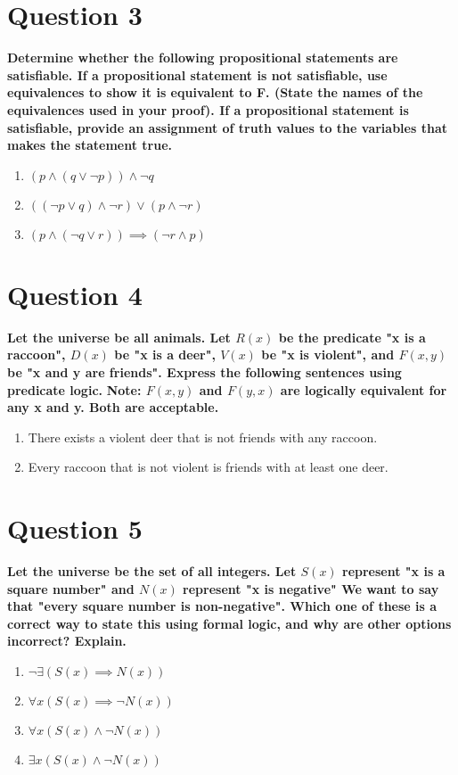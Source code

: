 \documentclass[11pt]{article}
\begin{document}
\clearpage
\section*{Question 3}
    \textbf{ Determine whether the following propositional statements are satisfiable. If a propositional statement is not satisfiable, use equivalences to show it is equivalent to F. (State the names of the equivalences used in your proof). If a propositional statement is satisfiable, provide an assignment of truth values to the variables that makes the statement true.}
    \begin{enumerate}[label=(\alph*)]
        \item \((p \land (q \lor \neg p)) \land \neg q\)
        \item \(((\neg p \lor q) \land \neg r) \lor (p \land \neg r)\)
        \item \((p \land (\neg q \lor r)) \implies (\neg r \land p)\)
    \end{enumerate}

\clearpage
\section*{Question 4}
    \textbf{Let the universe be all animals. Let \(R(x)\) be the predicate "x is a raccoon", \(D(x)\) be "x is a deer", \(V(x)\) be "x is violent", and \(F(x, y)\) be "x and y are friends". Express the following sentences using predicate logic.}\newline
    \textbf{Note: \(F(x, y)\) and \(F(y, x)\) are logically equivalent for any x and y. Both are acceptable.}
    \begin{enumerate}[label=(\alph*)]
        \item There exists a violent deer that is not friends with any raccoon.
        \item Every raccoon that is not violent is friends with at least one deer.
    \end{enumerate}

\clearpage
\section*{Question 5}
    \textbf{Let the universe be the set of all integers. Let \(S(x)\) represent "x is a square number" and \(N(x)\) represent "x is negative" We want to say that "every square number is non-negative". Which one of these is a correct way to state this using formal logic, and why are other options incorrect? Explain.}
    \begin{enumerate}[label=(\alph*)]
        \item \(\neg \exists (S(x) \implies N(x))\)
        \item \(\forall x(S(x) \implies \neg N(x))\)
        \item \(\forall x(S(x) \land \neg N(x))\)
        \item \(\exists x (S(x) \land \neg N(x))\)
    \end{enumerate}
\end{document}
